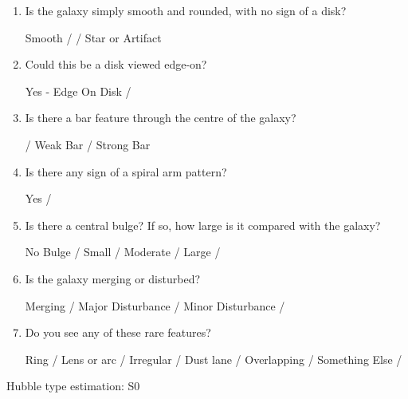 \documentclass[11pt,letterpaper]{article}
\begin{document}
\begin{enumerate}
\item Is the galaxy simply smooth and rounded, with no sign of a disk?

        Smooth /  / Star or Artifact

    \item Could this be a disk viewed edge-on?

Yes - Edge On Disk / 

\item Is there a bar feature through the centre of the galaxy?

     / Weak Bar / Strong Bar

\item Is there any sign of a spiral arm pattern?

    Yes / 

\item Is there a central bulge? If so, how large is it compared with the galaxy?

    No Bulge / Small / Moderate / Large / 

\item Is the galaxy merging or disturbed?

Merging / Major Disturbance / Minor Disturbance / 

\item Do you see any of these rare features?

    Ring / Lens or arc / Irregular / Dust lane / Overlapping / Something Else /  

\end{enumerate}

Hubble type estimation: S0 
\end{document}
